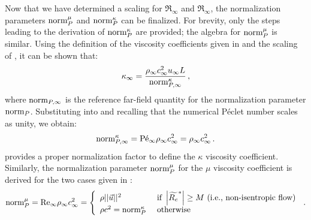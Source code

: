 Now that we have determined a scaling for $\Re_\infty$ and $\Re_\infty$, the normalization parameters $\textrm{norm}_P^\mu$ and $\textrm{norm}_P^\kappa$ can be finalized. For brevity, only the steps leading to the derivation of $\textrm{norm}_P^\kappa$ are provided; the algebra for $\textrm{norm}_P^\mu$ is similar. Using the definition of the viscosity coefficients given in  and the scaling of , it can be shown that:
%
\begin{equation}
\label{eq:norm_relation}
\kappa_\infty = \frac{ \rho_\infty c_\infty^2 u_\infty L }{ \textrm{norm}_{P,\infty}^{\kappa} } \, ,
\end{equation}
%
where $\textrm{norm}_{P,\infty}$ is the reference far-field quantity for the normalization parameter $\textrm{norm}_P$. Substituting  into  and recalling that the numerical P\'eclet number scales as unity, we obtain:
%
\begin{equation}
\label{eq:norm_relation_bis}
\textrm{norm}_{P,\infty}^{\kappa} = \textrm{P\'e}_\infty \rho_\infty c_\infty^2 = \rho_\infty c_\infty^2 \, .
\end{equation}
%
 provides a proper normalization factor to define the $\kappa$ viscosity coefficient.
Similarly, the normalization parameter $\textrm{norm}_P^\mu$ for the $\mu$ viscosity coefficient is derived for the two cases given in :
%
\begin{equation}
\label{eq:norm_ent2}
\textrm{norm}_P^\mu = \textrm{Re}_\infty \rho_\infty c_\infty^2 =  \left\{
\begin{array}{ll}
 \rho ||\vec{u} ||^2       & \text{ if } \left| \widetilde{R_e}^* \right| \geq M \text{ (i.e., non-isentropic flow)} \\
 \rho c^2 = \textrm{norm}_P^\kappa & \text{ otherwise}
\end{array}
\right. \,.
\end{equation}
%

